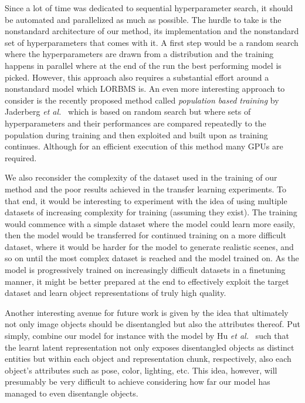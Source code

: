 \documentclass[a4paper,12pt]{report}
\begin{document}
Since a lot of time was dedicated to sequential hyperparameter search, it should be automated and parallelized as much as possible. The hurdle to take is the nonstandard architecture of our method, its implementation and the nonstandard set of hyperparameters that comes with it. A first step would be a random search where the hyperparameters are drawn from a distribution and the training happens in parallel where at the end of the run the best performing model is picked. However, this approach also requires a substantial effort around a nonstandard model which LORBMS is. An even more interesting approach to consider is the recently proposed method called \textit{population based training} by Jaderberg \textit{et al.}~\cite{PopBasedTraining} which is based on random search but where sets of hyperparameters and their performances are compared repeatedly to the population during training and then exploited and built upon as training continues. Although for an efficient execution of this method many GPUs are required. 

We also reconsider the complexity of the dataset used in the training of our method and the poor results achieved in the transfer learning experiments. To that end, it would be interesting to experiment with the idea of using multiple datasets of increasing complexity for training (assuming they exist). The training would commence with a simple dataset where the model could learn more easily, then the model would be transferred for continued training on a more difficult dataset, where it would be harder for the model to generate realistic scenes, and so on until the most complex dataset is reached and the model trained on. As the model is progressively trained on increasingly difficult datasets in a finetuning manner, it might be better prepared at the end to effectively exploit the target dataset and learn object representations of truly high quality.

Another interesting avenue for future work is given by the idea that ultimately not only image objects should be disentangled but also the attributes thereof. Put simply, combine our model for instance with the model by Hu \textit{et al.}~\cite{DisentFacOfVarByMixTh} such that the learnt latent representation not only exposes disentangled objects as distinct entities but within each object and representation chunk, respectively, also each object's attributes such as pose, color, lighting, etc. This idea, however, will presumably be very difficult to achieve considering how far our model has managed to even disentangle objects.
\end{document}

